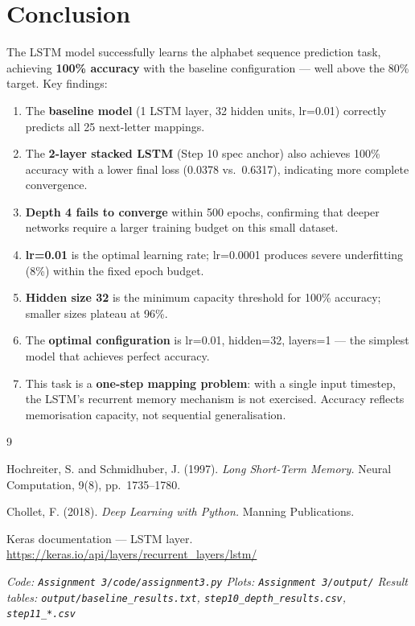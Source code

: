 \documentclass[12pt,a4paper]{article}
\begin{document}
\section{Conclusion}

The LSTM model successfully learns the alphabet sequence prediction task, achieving
\textbf{100\% accuracy} with the baseline configuration --- well above the 80\% target.
Key findings:

\begin{enumerate}
  \item The \textbf{baseline model} (1 LSTM layer, 32 hidden units, lr=0.01) correctly
        predicts all 25 next-letter mappings.
  \item The \textbf{2-layer stacked LSTM} (Step 10 spec anchor) also achieves 100\%
        accuracy with a lower final loss (0.0378 vs.\ 0.6317), indicating more complete
        convergence.
  \item \textbf{Depth 4 fails to converge} within 500 epochs, confirming that deeper
        networks require a larger training budget on this small dataset.
  \item \textbf{lr=0.01} is the optimal learning rate; lr=0.0001 produces severe
        underfitting (8\%) within the fixed epoch budget.
  \item \textbf{Hidden size 32} is the minimum capacity threshold for 100\% accuracy;
        smaller sizes plateau at 96\%.
  \item The \textbf{optimal configuration} is lr=0.01, hidden=32, layers=1 --- the
        simplest model that achieves perfect accuracy.
  \item This task is a \textbf{one-step mapping problem}: with a single input timestep,
        the LSTM's recurrent memory mechanism is not exercised. Accuracy reflects
        memorisation capacity, not sequential generalisation.
\end{enumerate}

\begin{thebibliography}{9}

  Hochreiter, S. and Schmidhuber, J. (1997). \textit{Long Short-Term Memory.}
  Neural Computation, 9(8), pp.\ 1735--1780.

  Chollet, F. (2018). \textit{Deep Learning with Python.} Manning Publications.

  Keras documentation --- LSTM layer.
  \url{https://keras.io/api/layers/recurrent_layers/lstm/}

\end{thebibliography}

\vspace{1em}
\noindent\small\textit{%
Code: \texttt{Assignment 3/code/assignment3.py}\quad
Plots: \texttt{Assignment 3/output/}\quad
Result tables: \texttt{output/baseline\_results.txt}, \texttt{step10\_depth\_results.csv},
\texttt{step11\_*.csv}%
}
\end{document}
